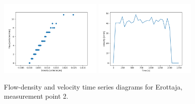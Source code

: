 \documentclass[english, 12pt, a4paper, elec, utf8, pdfa, online]{aaltothesis}
\begin{document}
\begin{figure}[ht!]
    \centering
    \includegraphics[width=0.45\textwidth]{graphs/Erottaja_2_flw_dns.png}
    \includegraphics[width=0.45\textwidth]{graphs/Erottaja_2_spd_time_6.png}
    \caption{Flow-density and velocity time series diagrams for Erottaja, measurement point 2.}
\end{figure}
\end{document}
